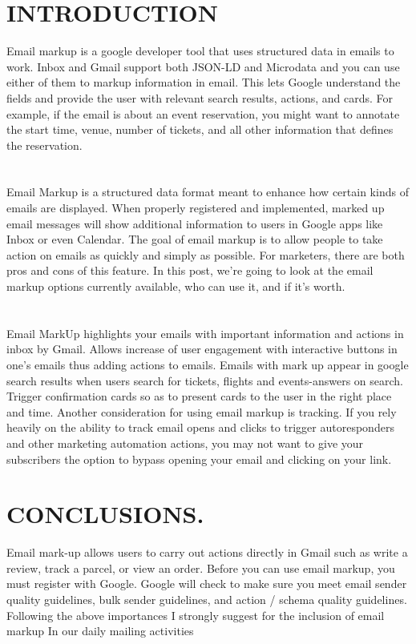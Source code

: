 \documentclass[9pt,a4paper]{article}
\begin{document}
\newpage
{}
\section{INTRODUCTION}
\cite{lee2003web}Email markup is a google developer tool that uses structured data in emails to work. Inbox and Gmail support both JSON-LD and Microdata and you can use either of them to markup information in email. This lets Google understand the fields and provide the user with relevant search results, actions, and cards. For example, if the email is about an event reservation, you might want to annotate the start time, venue, number of tickets, and all other information that defines the reservation.\cite{spellman2002design}
\section{}
Email Markup is a structured data format meant to enhance how certain kinds of emails are displayed. When properly registered and implemented, marked up email messages will show additional information to users in Google apps like Inbox or even Calendar. 
The goal of email markup is to allow people to take action on emails as quickly and simply as possible. For marketers, there are both pros and cons of this feature. In this post, we're going to look at the email markup options currently available, who can use it, and if it's worth.\cite{dhanjal2012markup}
\section{}
Email MarkUp highlights your emails with important information and actions in inbox by Gmail. Allows increase of user engagement with interactive buttons in one’s emails thus adding actions to emails. Emails with mark up appear in google search results when users search for tickets, flights and events-answers on search. Trigger confirmation cards so as to present cards to the user in the right place and time.\cite{sadoghi2013pooled}
Another consideration for using email markup is tracking. If you rely heavily on the ability to track email opens and clicks to trigger autoresponders and other marketing automation actions, you may not want to give your subscribers the option to bypass opening your email and clicking on your link.\cite{lee2002web}


\section{CONCLUSIONS.}

Email mark-up allows users to carry out actions directly in Gmail such as write a review, track a parcel, or view an order. Before you can use email markup, you must register with Google. Google will check to make sure you meet email sender quality guidelines, bulk sender guidelines, and action / schema quality guidelines. Following the above importances I strongly suggest for the inclusion of email markup In our daily mailing activities
\newpage


\end{document}
